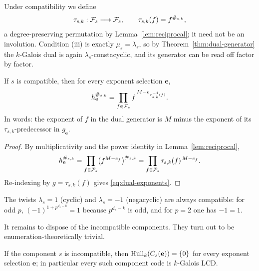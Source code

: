 Under compatibility we define
\[
\tau_{s,k}:\mathcal F_s\longrightarrow\mathcal F_s,\qquad \tau_{s,k}(f)=f^{\#_{s,k}},
\]
a degree-preserving permutation by Lemma~\ref{lem:reciprocal}; it need not be
an involution.  Condition (iii) is exactly $\mu_s=\lambda_s$, so by
Theorem~\ref{thm:dual-generator} the $k$-Galois dual is again
$\lambda_s$-constacyclic, and its generator can be read off factor by factor.

\begin{proposition}\label{prop:dual-exponents}
If $s$ is compatible, then for every exponent selection $\mathbf{e}$,
\begin{equation}\label{eq:dual-exponents}
h_{\mathbf{e}}^{\#_{s,k}}
   =\prod_{f\in\mathcal F_s} f^{\,M-e_{\tau_{s,k}^{-1}(f)}}.
\end{equation}
In words: the exponent of $f$ in the dual generator is $M$ minus the exponent
of its $\tau_{s,k}$-predecessor in $g_{\mathbf{e}}$.
\end{proposition}

\begin{proof}
By multiplicativity and the power identity in Lemma~\ref{lem:reciprocal},
\[
h_{\mathbf{e}}^{\#_{s,k}}
 =\prod_{f\in\mathcal F_s}\bigl(f^{M-e_f}\bigr)^{\#_{s,k}}
 =\prod_{f\in\mathcal F_s}\tau_{s,k}(f)^{\,M-e_f}.
\]
Re-indexing by $g=\tau_{s,k}(f)$ gives \eqref{eq:dual-exponents}.
\end{proof}

\begin{remark}\label{rem:special-twists}
The twists $\lambda_s=1$ (cyclic) and $\lambda_s=-1$ (negacyclic) are always
compatible: for odd $p$, $(-1)^{1+p^{d_s-k}}=1$ because $p^{d_s-k}$ is odd, and
for $p=2$ one has $-1=1$.
\end{remark}

It remains to dispose of the incompatible components.  They turn out to be
enumeration-theoretically trivial.

\begin{proposition}\label{prop:incompatible}
If the component $s$ is incompatible, then
$\operatorname{Hull}_k(C_s(\mathbf{e}))=\{0\}$ for every exponent selection $\mathbf{e}$; in
particular every such component code is $k$-Galois LCD.
\end{proposition}

